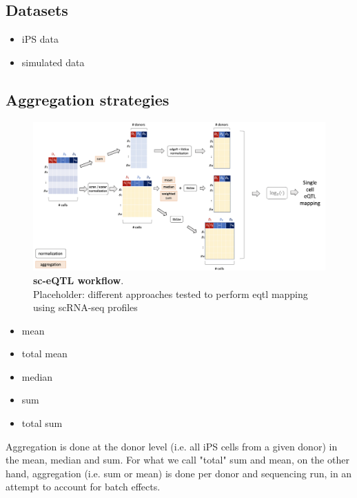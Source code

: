 \subsection{Datasets}

\begin{itemize}
    \item iPS data
    \item simulated data
\end{itemize}

\subsection{Aggregation strategies}


\begin{figure}[h]
\centering
\includegraphics[width=15cm]{Chapter3/Fig/sc_qtl_workflow.png}
\caption[\textbf{sc-eQTL workflow}]{\textbf{sc-eQTL workflow}.\\
Placeholder: different approaches tested to perform \gls{eqtl} mapping using scRNA-seq profiles}
\label{fig:sc_qtl_workflow}
\end{figure}

\begin{itemize}
    \item mean
    \item total mean
    \item median
    \item sum
    \item total sum
\end{itemize}

Aggregation is done at the donor level (i.e. all iPS cells from a given donor) in the mean, median and sum.
For what we call "total" sum and mean, on the other hand, aggregation (i.e. sum or mean) is done per donor and sequencing run, in an attempt to account for batch effects.

